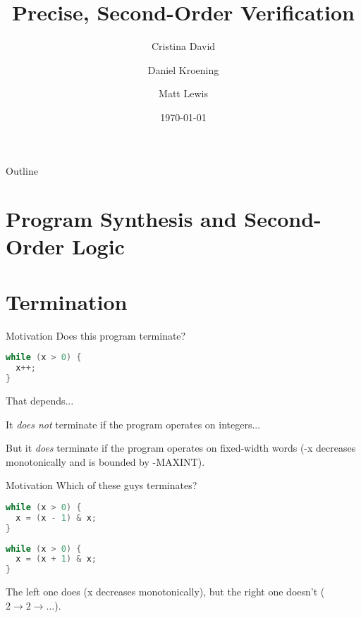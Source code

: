 \documentclass[xcolor=pdftex,t,11pt]{beamer}
\author{Cristina David \and Daniel Kroening \and Matt Lewis}
\title{Precise, Second-Order Verification}
\institute{Oxford University}
\date{\today}
\begin{document}

\begin{frame}[plain]
  \titlepage
\end{frame}

\begin{frame}{Outline}
  \tableofcontents
\end{frame}


\section{Program Synthesis and Second-Order Logic}



\section{Termination}


\begin{frame}[fragile]{Motivation}
Does this program terminate?
\begin{center}
\begin{minipage}{0.4\linewidth}
 \begin{lstlisting}[language=C,basicstyle=\normalsize]
while (x > 0) {
  x++;
}
 \end{lstlisting}
\end{minipage}
\end{center}

\pause

That depends...

It \emph{does not} terminate if the program operates on integers...

But it \emph{does} terminate if the program operates on fixed-width words
(-x decreases monotonically and is bounded by -MAXINT).

\end{frame}

\begin{frame}[fragile]{Motivation}
Which of these guys terminates?
\begin{center}
\begin{minipage}{0.45\linewidth}
 \begin{lstlisting}[language=C,basicstyle=\normalsize]
while (x > 0) {
  x = (x - 1) & x;
}
\end{lstlisting}
\end{minipage}
\begin{minipage}{0.45\linewidth}
 \begin{lstlisting}[language=C,basicstyle=\normalsize]
while (x > 0) {
  x = (x + 1) & x;
}
\end{lstlisting}
\end{minipage}
\end{center}

\pause

The left one does (x decreases monotonically), but the right one doesn't ($2 \rightarrow 2 \rightarrow \dots$).
\end{frame}
\end{document}

